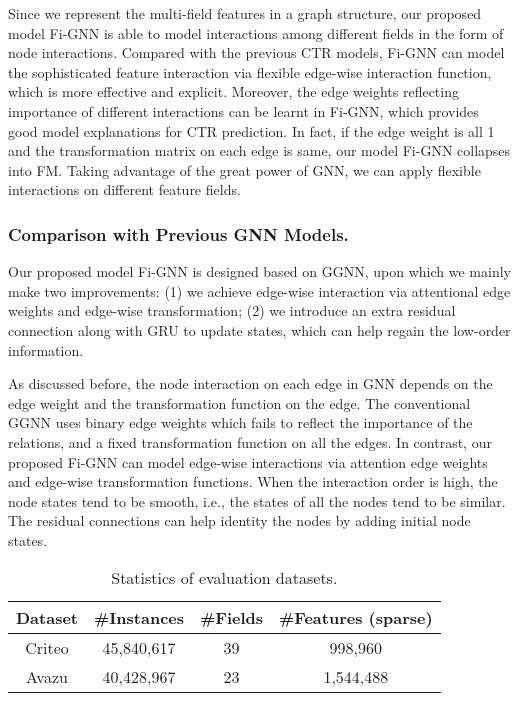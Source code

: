\documentclass[sigconf]{acmart}
\begin{document}
Since we represent the multi-field features in a graph structure, our proposed model Fi-GNN is able to model interactions among different fields in the form of node interactions.
Compared with the previous CTR models, Fi-GNN can model the sophisticated feature interaction via flexible edge-wise interaction function, which is more effective and explicit.
Moreover, the edge weights reflecting importance of different interactions can be learnt in Fi-GNN, which provides good model explanations for CTR prediction.   
In fact, if the edge weight is all 1 and the transformation matrix on each edge is same, our model Fi-GNN collapses into FM.
Taking advantage of the great power of GNN, we can apply flexible interactions on different feature fields.

\subsubsection{\textbf{Comparison with Previous GNN Models.}}
Our proposed model Fi-GNN is designed based on GGNN, upon which we mainly make two improvements:
(1) we achieve edge-wise interaction via attentional edge weights and edge-wise transformation;
(2) we introduce an extra residual connection along with GRU to update states, which can help regain the low-order information.

As discussed before, the node interaction on each edge in GNN depends on the edge weight and the transformation function on the edge.
The conventional GGNN uses binary edge weights which fails to reflect the importance of the relations, and a fixed transformation function on all the edges. 
In contrast, our proposed Fi-GNN can model edge-wise interactions via attention edge weights and edge-wise transformation functions.
When the interaction order is high, the node states tend to be smooth, i.e., the states of all the nodes tend to be similar.
The residual connections can help identity the nodes by adding initial node states.

\begin{table}[h]
\centering\caption{Statistics of evaluation datasets.}
\begin{tabular}{cccc} 
\hline
Dataset & \#Instances & \#Fields & \#Features (sparse)  \\
\hline
Criteo & 45,840,617 & 39 & 998,960 \\
Avazu & 40,428,967 & 23 & 1,544,488 \\
\hline
\end{tabular}\label{tab::dataset}
\end{table}
  
\end{document}
